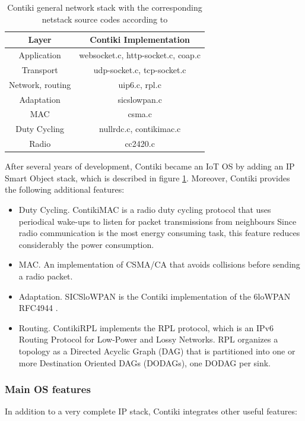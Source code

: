 \begin{table}[]
	\centering
	\caption{Contiki general network stack with the corresponding netstack source codes according to  \cite{contikiIPstack}}
	\label{tab:ContikiNetStack}
	\begin{tabular}{|c|c|}
		\hline
		\textbf{Layer}   & \textbf{Contiki Implementation}    \\ \hline
		Application      & websocket.c, http-socket.c, coap.c \\ \hline
		Transport        & udp-socket.c, tcp-socket.c         \\ \hline
		Network, routing & uip6.c, rpl.c                      \\ \hline
		Adaptation       & sicslowpan.c                       \\ \hline
		MAC              & csma.c                             \\ \hline
		Duty Cycling     & nullrdc.c, contikimac.c            \\ \hline
		Radio            & cc2420.c                           \\ \hline
	\end{tabular}
\end{table}
After several years of development, Contiki became an IoT OS by adding an IP Smart Object stack, which is described in figure \ref{tab:ContikiNetStack}.
Moreover, Contiki provides the following additional features:
\begin{itemize}
	\item Duty Cycling. ContikiMAC \cite{dunkels2011contikimac} is a radio duty cycling protocol that uses periodical wake-ups to listen for packet transmissions from neighbours
	Since radio communication is the most energy consuming task, this feature reduces considerably the power consumption.
	\item MAC. An implementation of CSMA/CA that avoids collisions before sending a radio packet.
	\item Adaptation. SICSloWPAN is the Contiki implementation of the 6loWPAN RFC4944 \cite{rfc4944}.
	\item Routing. ContikiRPL \cite{tsiftes2010contikirpl} implements the RPL \cite{rfc6550} protocol, which is an IPv6 Routing Protocol for Low-Power and Lossy Networks. RPL organizes a	topology as a Directed Acyclic Graph (DAG) that is partitioned into one or more Destination Oriented DAGs (DODAGs), one DODAG per sink.
\end{itemize}

\subsubsection{Main OS features}
In addition to a very complete IP stack, Contiki integrates other useful features:

